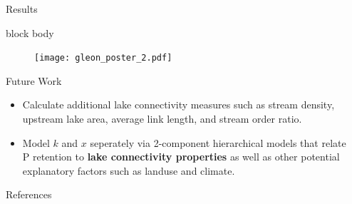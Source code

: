 \documentclass[final,hyperref={pdfpagelabels=false}]{beamer}
\begin{document}
\begin{frame}[t]
\begin{columns}[t]
\begin{column}{.465\textwidth}
\begin{block}{Results}
{\begin{beamercolorbox}[wd=\textwidth,rounded=true]{block body}
\begin{figure}
  \texttt{[image: gleon\_poster\_2.pdf]}
\end{figure}

\end{beamercolorbox}
}

\vspace{0.5em}
\end{block}


\vspace{0.5em}

\begin{block}{Future Work}

\begin{itemize}
\item Calculate additional lake connectivity measures such as stream density, upstream lake area, average link length, and stream order ratio.
\vspace{1em}
\item Model $k$ and $x$ seperately via 2-component hierarchical models that relate P retention to \textbf{lake connectivity properties} as well as other potential explanatory factors such as landuse and climate.
\end{itemize}
\end{block}


\vspace{0.5em}

\begin{block}{References}

\nocite{*}
\begingroup
\setlength\bibitemsep{0pt}
\setlength\bibnamesep{0pt}
\printbibliography[heading=none]
\endgroup
\end{block}


\end{column} %

\begin{column}{.015\textwidth}\end{column} %


\end{columns}
\end{frame}
\end{document}
